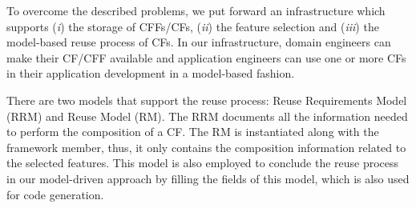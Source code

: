  To overcome the described problems, we put forward an infrastructure which supports (\textit{i}) the storage of CFFs/CFs, (\textit{ii}) the feature selection and (\textit{iii}) the model-based reuse process of CFs. In our infrastructure, domain engineers can make their CF/CFF available and application engineers can use one or more CFs in their application development in a model-based fashion.


There are two models that support the reuse process:  
  Reuse Requirements Model (RRM) and Reuse Model (RM). The RRM documents all the information needed to perform the composition of a CF. %
 The RM is instantiated along with the framework member, thus, it only contains the composition information related to the selected features.
 This model is also employed to conclude the reuse process in our model-driven approach by filling the fields of this model, which is also used for code generation.
